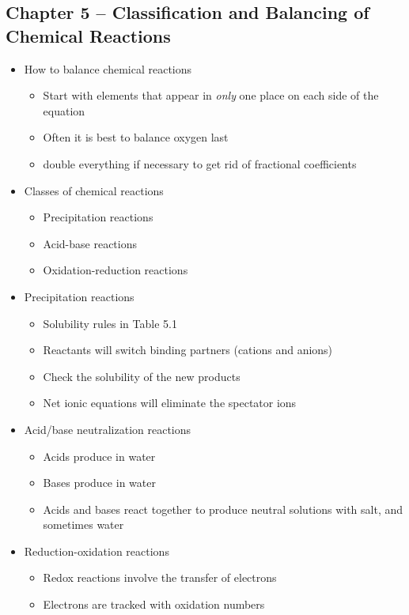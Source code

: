 \documentclass[12pt, letterpaper]{memoir}
\begin{document}
	\subsection*{Chapter 5 --  Classification and Balancing of Chemical Reactions}
	\begin{itemize}
		\item How to balance chemical reactions
		\begin{itemize}
			\item Start with elements that appear in \emph{only} one place on each side of the equation
			\item Often it is best to balance oxygen last
			\item double everything if necessary to get rid of fractional coefficients
		\end{itemize}
		\item Classes of chemical reactions
		\begin{itemize}
			\item Precipitation reactions
			\item Acid-base reactions
			\item Oxidation-reduction reactions
		\end{itemize}
		\item Precipitation reactions
		\begin{itemize}
			\item Solubility rules in Table 5.1
			\item Reactants will switch binding partners (cations and anions)
			\item Check the solubility of the new products
			\item Net ionic equations will eliminate the spectator ions
		\end{itemize}
		\item Acid/base neutralization reactions
		\begin{itemize}
			\item Acids produce  in water
			\item Bases produce  in water
			\item Acids and bases react together to produce neutral solutions with salt, and sometimes water
		\end{itemize}
		\item Reduction-oxidation reactions
		\begin{itemize}
			\item Redox reactions involve the transfer of electrons
			\item Electrons are tracked with oxidation numbers

\end{itemize}
\end{itemize}
\end{document}
